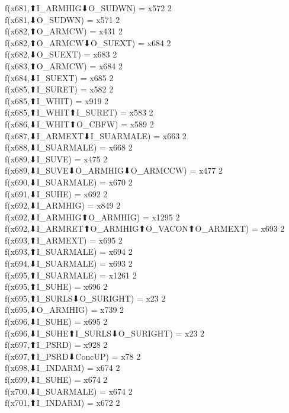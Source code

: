 f(x681,⬆I_ARMHIG⬇O_SUDWN) = x572 {2} \\
f(x681,⬇O_SUDWN) = x571 {2} \\
f(x682,⬆O_ARMCW) = x431 {2} \\
f(x682,⬆O_ARMCW⬇O_SUEXT) = x684 {2} \\
f(x682,⬇O_SUEXT) = x683 {2} \\
f(x683,⬆O_ARMCW) = x684 {2} \\
f(x684,⬇I_SUEXT) = x685 {2} \\
f(x685,⬆I_SURET) = x582 {2} \\
f(x685,⬆I_WHIT) = x919 {2} \\
f(x685,⬆I_WHIT⬆I_SURET) = x583 {2} \\
f(x686,⬇I_WHIT⬆O_CBFW) = x589 {2} \\
f(x687,⬇I_ARMEXT⬇I_SUARMALE) = x663 {2} \\
f(x688,⬇I_SUARMALE) = x668 {2} \\
f(x689,⬇I_SUVE) = x475 {2} \\
f(x689,⬇I_SUVE⬇O_ARMHIG⬇O_ARMCCW) = x477 {2} \\
f(x690,⬇I_SUARMALE) = x670 {2} \\
f(x691,⬇I_SUHE) = x692 {2} \\
f(x692,⬇I_ARMHIG) = x849 {2} \\
f(x692,⬇I_ARMHIG⬆O_ARMHIG) = x1295 {2} \\
f(x692,⬇I_ARMRET⬆O_ARMHIG⬆O_VACON⬆O_ARMEXT) = x693 {2} \\
f(x693,⬆I_ARMEXT) = x695 {2} \\
f(x693,⬆I_SUARMALE) = x694 {2} \\
f(x694,⬇I_SUARMALE) = x693 {2} \\
f(x695,⬆I_SUARMALE) = x1261 {2} \\
f(x695,⬆I_SUHE) = x696 {2} \\
f(x695,⬆I_SURLS⬇O_SURIGHT) = x23 {2} \\
f(x695,⬇O_ARMHIG) = x739 {2} \\
f(x696,⬇I_SUHE) = x695 {2} \\
f(x696,⬇I_SUHE⬆I_SURLS⬇O_SURIGHT) = x23 {2} \\
f(x697,⬆I_PSRD) = x928 {2} \\
f(x697,⬆I_PSRD⬇ConcUP) = x78 {2} \\
f(x698,⬇I_INDARM) = x674 {2} \\
f(x699,⬇I_SUHE) = x674 {2} \\
f(x700,⬇I_SUARMALE) = x674 {2} \\
f(x701,⬆I_INDARM) = x672 {2} \\
